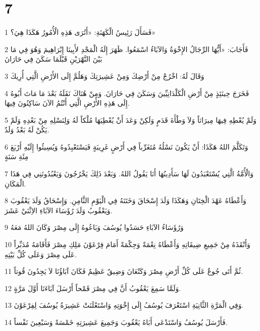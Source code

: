 \chapter{7}

\par 1 فَسَأَلَ رَئِيسُ الْكَهَنَةِ: «أَتُرَى هَذِهِ الْأُمُورُ هَكَذَا هِيَ؟»
\par 2 فَأَجَابَ: «أَيُّهَا الرِّجَالُ الإِخْوَةُ وَالآبَاءُ اسْمَعُوا. ظَهَرَ إِلَهُ الْمَجْدِ لأَبِينَا إِبْرَاهِيمَ وَهُوَ فِي مَا بَيْنَ النَّهْرَيْنِ قَبْلَمَا سَكَنَ فِي حَارَانَ
\par 3 وَقَالَ لَهُ: اخْرُجْ مِنْ أَرْضِكَ وَمِنْ عَشِيرَتِكَ وَهَلُمَّ إِلَى الأَرْضِ الَّتِي أُرِيكَ
\par 4 فَخَرَجَ حِينَئِذٍ مِنْ أَرْضِ الْكَلْدَانِيِّينَ وَسَكَنَ فِي حَارَانَ. وَمِنْ هُنَاكَ نَقَلَهُ بَعْدَ مَا مَاتَ أَبُوهُ إِلَى هَذِهِ الأَرْضِ الَّتِي أَنْتُمُ الآنَ سَاكِنُونَ فِيهَا.
\par 5 وَلَمْ يُعْطِهِ فِيهَا مِيرَاثاً وَلاَ وَطْأَةَ قَدَمٍ وَلَكِنْ وَعَدَ أَنْ يُعْطِيَهَا مُلْكاً لَهُ وَلِنَسْلِهِ مِنْ بَعْدِهِ وَلَمْ يَكُنْ لَهُ بَعْدُ وَلَدٌ.
\par 6 وَتَكَلَّمَ اللهُ هَكَذَا: أَنْ يَكُونَ نَسْلُهُ مُتَغَرِّباً فِي أَرْضٍ غَرِيبَةٍ فَيَسْتَعْبِدُوهُ وَيُسِيئُوا إِلَيْهِ أَرْبَعَ مِئَةِ سَنَةٍ
\par 7 وَالْأُمَّةُ الَّتِي يُسْتَعْبَدُونَ لَهَا سَأَدِينُهَا أَنَا يَقُولُ اللهُ. وَبَعْدَ ذَلِكَ يَخْرُجُونَ وَيَعْبُدُونَنِي فِي هَذَا الْمَكَانِ.
\par 8 وَأَعْطَاهُ عَهْدَ الْخِتَانِ وَهَكَذَا وَلَدَ إِسْحَاقَ وَخَتَنَهُ فِي الْيَوْمِ الثَّامِنِ. وَإِسْحَاقُ وَلَدَ يَعْقُوبَ وَيَعْقُوبُ وَلَدَ رُؤَسَاءَ الآبَاءِ الاِثْنَيْ عَشَرَ.
\par 9 وَرُؤَسَاءُ الآبَاءِ حَسَدُوا يُوسُفَ وَبَاعُوهُ إِلَى مِصْرَ وَكَانَ اللهُ مَعَهُ
\par 10 وَأَنْقَذَهُ مِنْ جَمِيعِ ضِيقَاتِهِ وَأَعْطَاهُ نِعْمَةً وَحِكْمَةً أَمَامَ فِرْعَوْنَ مَلِكِ مِصْرَ فَأَقَامَهُ مُدَبِّراً عَلَى مِصْرَ وَعَلَى كُلِّ بَيْتِهِ.
\par 11 ثُمَّ أَتَى جُوعٌ عَلَى كُلِّ أَرْضِ مِصْرَ وَكَنْعَانَ وَضِيقٌ عَظِيمٌ فَكَانَ آبَاؤُنَا لاَ يَجِدُونَ قُوتاً.
\par 12 وَلَمَّا سَمِعَ يَعْقُوبُ أَنَّ فِي مِصْرَ قَمْحاً أَرْسَلَ آبَاءَنَا أَوَّلَ مَرَّةٍ.
\par 13 وَفِي الْمَرَّةِ الثَّانِيَةِ اسْتَعْرَفَ يُوسُفُ إِلَى إِخْوَتِهِ وَاسْتَعْلَنَتْ عَشِيرَةُ يُوسُفَ لِفِرْعَوْنَ.
\par 14 فَأَرْسَلَ يُوسُفُ وَاسْتَدْعَى أَبَاهُ يَعْقُوبَ وَجَمِيعَ عَشِيرَتِهِ خَمْسَةً وَسَبْعِينَ نَفْساً.
